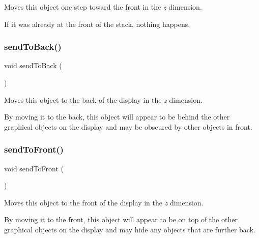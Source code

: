 Moves this object one step toward the front in the {\itshape z} dimension. 

If it was already at the front of the stack, nothing happens. \mbox{\label{classsgl_1_1GObject_a0f7f1efbb7fd46dde2867c4ad0330896}} 
\subsubsection{\texorpdfstring{send\+To\+Back()}{sendToBack()}}
{\footnotesize\ttfamily void send\+To\+Back (\begin{DoxyParamCaption}{ }\end{DoxyParamCaption})\hspace{0.3cm}{\ttfamily [inherited]}}



Moves this object to the back of the display in the {\itshape z} dimension. 

By moving it to the back, this object will appear to be behind the other graphical objects on the display and may be obscured by other objects in front. \mbox{\label{classsgl_1_1GObject_aee33d68488e46827ef55fac07f40a9b2}} 
\subsubsection{\texorpdfstring{send\+To\+Front()}{sendToFront()}}
{\footnotesize\ttfamily void send\+To\+Front (\begin{DoxyParamCaption}{ }\end{DoxyParamCaption})\hspace{0.3cm}{\ttfamily [inherited]}}



Moves this object to the front of the display in the {\itshape z} dimension. 

By moving it to the front, this object will appear to be on top of the other graphical objects on the display and may hide any objects that are further back. \mbox{\label{classsgl_1_1GObject_a1e43371668ae850193cebedb44e1bbe3}} 
